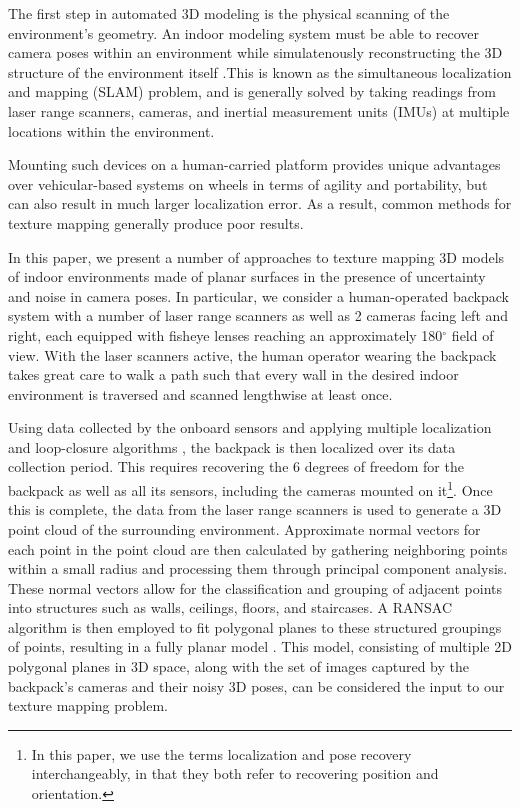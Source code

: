\documentclass[10pt,twocolumn,letterpaper]{article}
\begin{document}
The first step in automated 3D modeling is the physical scanning of
the environment's geometry. An indoor modeling system must be able to
recover camera poses within an environment while simulatenously
reconstructing the 3D structure of the environment itself
\cite{chen2010indoor, hz, kua2012loopclosure, liu2010indoor}.This is
known as the simultaneous localization and mapping (SLAM) problem, and
is generally solved by taking readings from laser range scanners,
cameras, and inertial measurement units (IMUs) at multiple locations
within the environment.

Mounting such devices on a human-carried platform provides unique
advantages over vehicular-based systems on wheels in terms of agility
and portability, but can also result in much larger localization
error. As a result, common methods for texture mapping generally
produce poor results.

In this paper, we present a number of approaches to texture mapping 3D
models of indoor environments made of planar surfaces in the presence
of uncertainty and noise in camera poses. In particular, we consider a
human-operated backpack system with a number of laser range scanners
as well as 2 cameras facing left and right, each equipped with fisheye
lenses reaching an approximately 180$^{\circ}$ field of view. With the
laser scanners active, the human operator wearing the backpack takes
great care to walk a path such that every wall in the desired indoor
environment is traversed and scanned lengthwise at least once.

Using data collected by the onboard sensors and applying multiple
localization and loop-closure algorithms \cite{chen2010indoor,
  kua2012loopclosure, liu2010indoor}, the backpack is then localized
over its data collection period. This requires recovering the 6
degrees of freedom for the backpack as well as all its sensors,
including the cameras mounted on it\footnote{In this paper, we use the
  terms localization and pose recovery interchangeably, in that they
  both refer to recovering position and orientation.}. Once this is
complete, the data from the laser range scanners is used to generate a
3D point cloud of the surrounding environment.  Approximate normal
vectors for each point in the point cloud are then calculated by
gathering neighboring points within a small radius and processing them
through principal component analysis. These normal vectors allow for
the classification and grouping of adjacent points into structures
such as walls, ceilings, floors, and staircases. A RANSAC algorithm is
then employed to fit polygonal planes to these structured groupings of
points, resulting in a fully planar model
\cite{sanchez2012point}. This model, consisting of multiple 2D
polygonal planes in 3D space, along with the set of images captured by
the backpack's cameras and their noisy 3D poses, can be considered the
input to our texture mapping problem.
\end{document}
